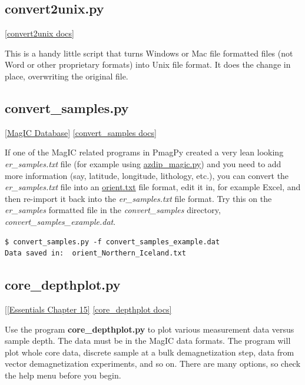 \documentclass[11pt]{book}
\begin{document}
{{\subsection{convert2unix.py}
\href{https://github.com/PmagPy/PmagPy/blob/master/programs/convert2unix.py}{[convert2unix docs]}

This is a handy little script that turns Windows or Mac file formatted files (not Word or other proprietary formats) into Unix file format.  It does the change in place, overwriting the original file.

\subsection{convert\_samples.py}
\href{#MagICDatabase}{[MagIC Database]}
\href{https://github.com/PmagPy/PmagPy/blob/master/programs/convert_samples.py}{[convert\_samples docs]}

If one of the MagIC related programs in PmagPy created a very lean looking {\it er\_samples.txt} file (for example using \href{#azdip_magic.py}{azdip\_magic.py}) and you need to add more information (say, latitude, longitude, lithology, etc.), you can convert the {\it er\_samples.txt} file into an \href{#orientation_magic.py}{orient.txt} file format, edit it in, for example Excel, and then re-import it back into the {\it er\_samples.txt} file format.  Try this on the {\it er\_samples} formatted file in the {\it convert\_samples} directory, {\it convert\_samples\_example.dat}.

\begin{verbatim}
$ convert_samples.py -f convert_samples_example.dat
Data saved in:  orient_Northern_Iceland.txt
\end{verbatim}




\subsection{core\_depthplot.py} [\href{http://earthref.org/MAGIC/books/Tauxe/Essentials/WebBook3ch15.html#ch15}{[Essentials Chapter 15]}
\href{https://github.com/PmagPy/PmagPy/blob/master/programs/core_depthplot.py}{[core\_depthplot docs]}

Use the program {\bf core\_depthplot.py} to plot various measurement data versus sample depth.   The data must be in the MagIC data formats.  The program will plot whole core data, discrete sample at a bulk demagnetization step, data from vector demagnetization experiments, and so on.  There are many options, so check the help menu before you begin.

}}
\end{document}

